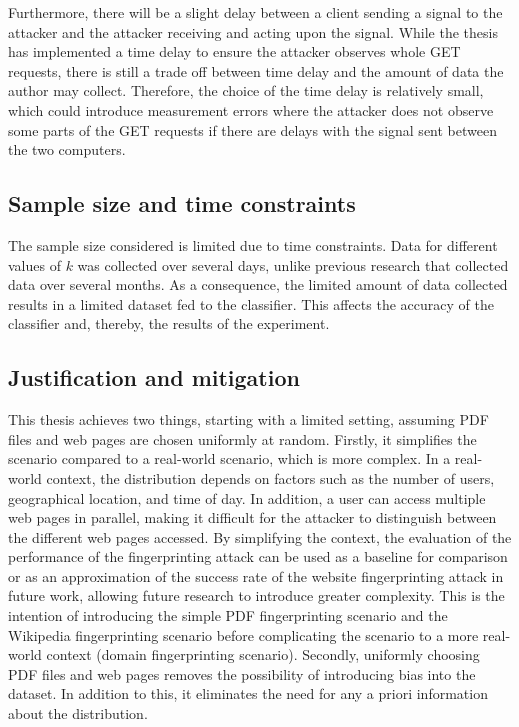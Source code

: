 Furthermore, there will be a slight delay between a client sending a signal to the attacker and the attacker receiving and acting upon the signal. While the thesis has implemented a time delay to ensure the attacker observes whole GET requests, there is still a trade off between time delay and the amount of data the author may collect. Therefore, the choice of the time delay is relatively small, which could introduce measurement errors where the attacker does not observe some parts of the GET requests if there are delays with the signal sent between the two computers.

\subsection{Sample size and time constraints\label{subsec:sample-methodology}}

The sample size considered is limited due to time constraints. Data for different values of $k$ was collected over several days, unlike previous research that collected data over several months. As a consequence, the limited amount of data collected results in a limited dataset fed to the classifier. This affects the accuracy of the classifier and, thereby, the results of the experiment.

\subsection{Justification and mitigation\label{sec:justification-methodology}}

This thesis achieves two things, starting with a limited setting, assuming PDF files and web pages are chosen uniformly at random. Firstly, it simplifies the scenario compared to a real-world scenario, which is more complex. In a real-world context, the distribution depends on factors such as the number of users, geographical location, and time of day. In addition, a user can access multiple web pages in parallel, making it difficult for the attacker to distinguish between the different web pages accessed. By simplifying the context, the evaluation of the performance of the fingerprinting attack can be used as a baseline for comparison or as an approximation of the success rate of the website fingerprinting attack in future work, allowing future research to introduce greater complexity. This is the intention of introducing the simple PDF fingerprinting scenario and the Wikipedia fingerprinting scenario before complicating the scenario to a more real-world context (domain fingerprinting scenario). Secondly, uniformly choosing PDF files and web pages removes the possibility of introducing bias into the dataset. In addition to this, it eliminates the need for any a priori information about the distribution. 

